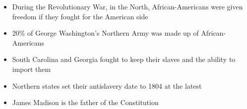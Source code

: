 \documentclass[12pt]{article}
\begin{document}
\begin{itemize}
  \item During the Revolutionary War, in the North, African-Americans were given freedom if they fought for the American side

  \item 20\% of George Washington's Northern Army was made up of African-Americans

  \item South Carolina and Georgia fought to keep their slaves and the ability to import them

  \item Northern states set their antislavery date to 1804 at the latest

  \item James Madison is the father of the Constitution

\end{itemize}
\end{document}
